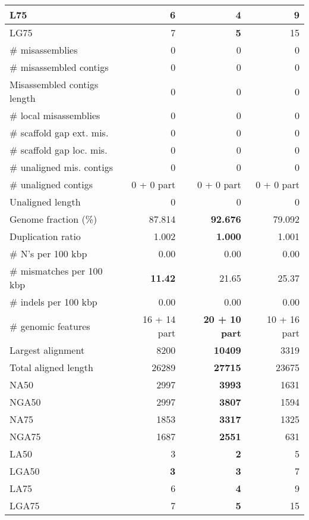 \documentclass[12pt,a4paper]{article}
\begin{document}
\begin{table}[ht]
\begin{center}
\begin{tabular}{|l*{3}{|r}|}
L75 & 6 & {\bf 4} & 9 \\ \hline
LG75 & 7 & {\bf 5} & 15 \\ \hline
\# misassemblies & 0 & 0 & 0 \\ \hline
\# misassembled contigs & 0 & 0 & 0 \\ \hline
Misassembled contigs length & 0 & 0 & 0 \\ \hline
\# local misassemblies & 0 & 0 & 0 \\ \hline
\# scaffold gap ext. mis. & 0 & 0 & 0 \\ \hline
\# scaffold gap loc. mis. & 0 & 0 & 0 \\ \hline
\# unaligned mis. contigs & 0 & 0 & 0 \\ \hline
\# unaligned contigs & 0 + 0 part & 0 + 0 part & 0 + 0 part \\ \hline
Unaligned length & 0 & 0 & 0 \\ \hline
Genome fraction (\%) & 87.814 & {\bf 92.676} & 79.092 \\ \hline
Duplication ratio & 1.002 & {\bf 1.000} & 1.001 \\ \hline
\# N's per 100 kbp & 0.00 & 0.00 & 0.00 \\ \hline
\# mismatches per 100 kbp & {\bf 11.42} & 21.65 & 25.37 \\ \hline
\# indels per 100 kbp & 0.00 & 0.00 & 0.00 \\ \hline
\# genomic features & 16 + 14 part & {\bf 20 + 10 part} & 10 + 16 part \\ \hline
Largest alignment & 8200 & {\bf 10409} & 3319 \\ \hline
Total aligned length & 26289 & {\bf 27715} & 23675 \\ \hline
NA50 & 2997 & {\bf 3993} & 1631 \\ \hline
NGA50 & 2997 & {\bf 3807} & 1594 \\ \hline
NA75 & 1853 & {\bf 3317} & 1325 \\ \hline
NGA75 & 1687 & {\bf 2551} & 631 \\ \hline
LA50 & 3 & {\bf 2} & 5 \\ \hline
LGA50 & {\bf 3} & {\bf 3} & 7 \\ \hline
LA75 & 6 & {\bf 4} & 9 \\ \hline
LGA75 & 7 & {\bf 5} & 15 \\ \hline
\end{tabular}
\end{center}
\end{table}
\end{document}
